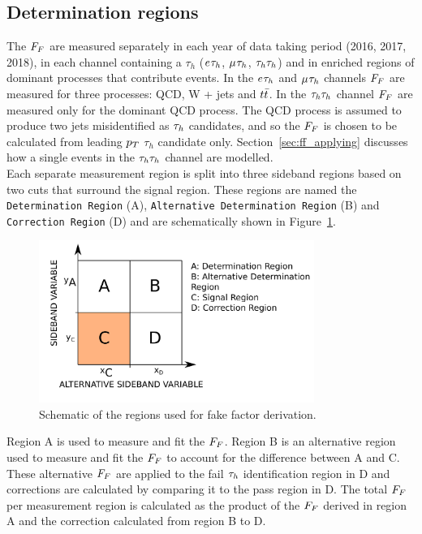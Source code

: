 \subsection{Determination regions}
\label{sec:ff_dr}

The $F_{F}$ are measured separately in each year of data taking period (2016, 2017, 2018), in each channel containing a $\tau_h$ ($e_{}\tau_{h}$, $\mu_{}\tau_{h}$, $\tau_{h}\tau_{h}$) and in enriched regions of dominant processes that contribute \jtth events.
In the $e_{}\tau_{h}$ and $\mu_{}\tau_{h}$ channels $F_{F}$ are measured for three processes: \ac{QCD}, W + jets and $t\bar{t}$.
In the $\tau_{h}\tau_{h}$ channel $F_{F}$ are measured only for the dominant \ac{QCD} process.
The \ac{QCD} process is assumed to produce two jets misidentified as $\tau_{h}$ candidates, and so the $F_{F}$ is chosen to be calculated from leading $p_{T}$ $\tau_h$ candidate only.
Section~\ref{sec:ff_applying} discusses how a single \jtth events in the $\tau_{h}\tau_{h}$ channel are modelled. \\

Each separate measurement region is split into three sideband regions based on two cuts that surround the signal region.
These regions are named the \texttt{Determination Region} (A), \texttt{Alternative Determination Region} (B) and \texttt{Correction Region} (D) and are schematically shown in Figure~\ref{fig:ff_schematic}. \\

\begin{figure}[!hbtp]
\centering
    \includegraphics[width=0.8\textwidth]{Figures/ff_diagram_v2.pdf}
\caption[Diagram of the regions used for fake factor derivation.]{Schematic of the regions used for fake factor derivation.}
\label{fig:ff_schematic}
\end{figure}

Region A is used to measure and fit the $F_{F}$.
Region B is an alternative region used to measure and fit the $F_{F}$ to account for the difference between A and C.
These alternative $F_{F}$ are applied to the fail $\tau_{h}$ identification region in D and corrections are calculated by comparing it to the pass region in D.
The total $F_{F}$ per measurement region is calculated as the product of the $F_{F}$ derived in region A and the correction calculated from region B to D. \\

